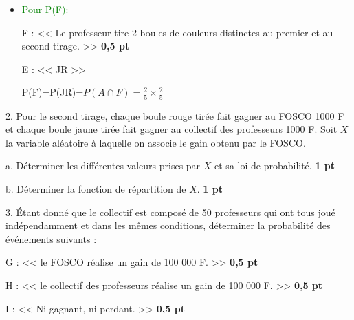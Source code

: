 \documentclass[12pt]{article}
\begin{document}
\begin{itemize}
\item \underline{\textcolor{green}{Pour P(F):}}

F : << Le professeur tire 2 boules de couleurs distinctes au premier et au second tirage. >> \textbf{0,5 pt}

E : << JR >>

P(F)=P(JR)=$P(A\cap F)=\frac{2}{5}\times \frac{2}{5}$

		\begin{center}
			\textcolor{green}{}
		\end{center}
\end{itemize}
2. Pour le second tirage, chaque boule rouge tirée fait gagner au FOSCO 1000 F et chaque boule jaune tirée fait gagner au collectif des professeurs 1000 F.
Soit \(X\) la variable aléatoire à laquelle on associe le gain obtenu par le FOSCO.

a. Déterminer les différentes valeurs prises par \(X\) et sa loi de probabilité. \textbf{1 pt}

b. Déterminer la fonction de répartition de \(X\). \textbf{1 pt}

3. Étant donné que le collectif est composé de 50 professeurs qui ont tous joué indépendamment et dans les mêmes conditions, déterminer la probabilité des événements suivants :

G : << le FOSCO réalise un gain de 100 000 F. >> \textbf{0,5 pt}

H : << le collectif des professeurs réalise un gain de 100 000 F. >> \textbf{0,5 pt}

I : << Ni gagnant, ni perdant. >> \textbf{0,5 pt}
\end{document}

